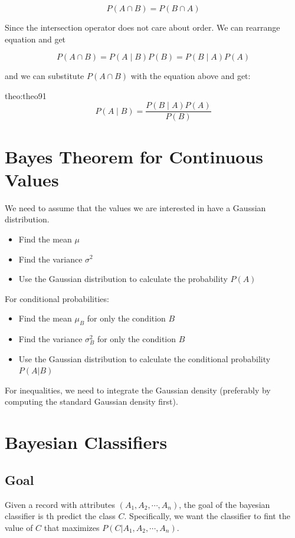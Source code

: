 \begin{equation*}
    P(A \cap B) = P(B \cap A)
\end{equation*}

Since the intersection operator does not care about order. We can rearrange
equation and get

\begin{equation*}
    P(A \cap B) = P(A \mid B)P(B) = P(B \mid A)P(A)
\end{equation*}

and we can substitute $P(A \cap B)$ with the equation above and get:

\begin{theo}[]{theo:theo91}
\label{eq:bayes}
\[
P(A \mid B) = \frac{P(B \mid A) P(A)}{P(B)}
\]
\end{theo}

\section{Bayes Theorem for Continuous Values}

We need to assume that the values we are interested in have a Gaussian distribution.
\begin{itemize}
    \item Find the mean $\mu$
    \item Find the variance $\sigma^2$
    \item Use the Gaussian distribution to calculate the probability $P(A)$
\end{itemize}
\medskip

For conditional probabilities:
\begin{itemize}
    \item Find the mean $\mu_B$ for only the condition $B$
    \item Find the variance $\sigma^2_B$ for only the condition $B$
    \item Use the Gaussian distribution to calculate the conditional probability $P(A|B)$
\end{itemize}
\medskip

For inequalities, we need to integrate the Gaussian density (preferably by computing the standard Gaussian density first).

\section{Bayesian Classifiers}
\subsection{Goal}
Given a record with attributes $(A_1, A_2, \cdots, A_n)$, the goal of the bayesian classifier is th predict the class $C$.
Specifically, we want the classifier to fint the value of $C$ that maximizes $P(C|A_1, A_2, \cdots, A_n)$.

